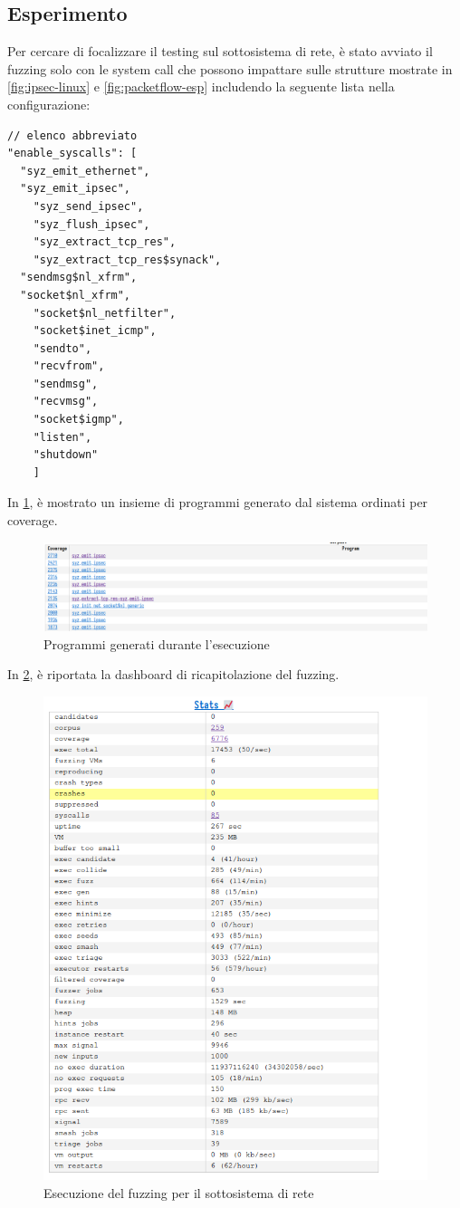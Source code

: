 \documentclass{article}
\begin{document}
\subsection{Esperimento}
Per cercare di focalizzare il testing sul sottosistema di rete, è stato avviato il fuzzing 
solo con le system call che possono impattare sulle strutture mostrate in 
\cref{fig:ipsec-linux} e \cref{fig:packetflow-esp} 
includendo la seguente lista nella configurazione:

\begin{verbatim}
// elenco abbreviato
"enable_syscalls": [
  "syz_emit_ethernet",
  "syz_emit_ipsec",
	"syz_send_ipsec",
	"syz_flush_ipsec",
	"syz_extract_tcp_res",
	"syz_extract_tcp_res$synack",
  "sendmsg$nl_xfrm",
  "socket$nl_xfrm",
	"socket$nl_netfilter",
	"socket$inet_icmp",
	"sendto",
	"recvfrom",
	"sendmsg",
	"recvmsg",
	"socket$igmp",
	"listen",
	"shutdown"
	] 
\end{verbatim}

In \cref{fig:corpus}, è mostrato un 
insieme di programmi generato dal sistema ordinati per coverage.
\begin{figure}[h]
  \begin{center}
    \includegraphics[width=.9\textwidth]{figures/corpus.png}
  \end{center}
  \caption{Programmi generati durante l'esecuzione}\label{fig:corpus}
\end{figure}

In \cref{fig:fuzzing}, è
riportata la dashboard di ricapitolazione del fuzzing.
\begin{figure}[h]
  \begin{center}
    \includegraphics[width=.7\textwidth]{figures/experiment.png}
  \end{center}
  \caption{Esecuzione del fuzzing per il sottosistema di rete}\label{fig:fuzzing}
\end{figure}

\clearpage


\end{document}
